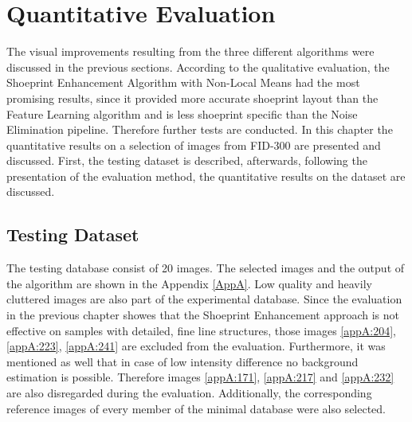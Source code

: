 \documentclass[draft,final]{vutinfth} %
\begin{document}
\section{Quantitative Evaluation}
\par
The visual improvements resulting from the three different algorithms were discussed in the previous sections.
According to the qualitative evaluation, the Shoeprint Enhancement Algorithm with Non-Local Means had the most promising results, since it provided more accurate shoeprint layout than the Feature Learning algorithm and is less shoeprint specific than the Noise Elimination pipeline.
Therefore further tests are conducted.
In this chapter the quantitative results on a selection of images from FID-300 are presented and discussed.
First, the testing dataset is described, afterwards, following the presentation of the evaluation method, the quantitative results on the dataset are discussed.

\subsection{Testing Dataset}

The testing database consist of 20 images.
The selected images and the output of the algorithm are shown in the Appendix \ref{AppA}.
Low quality and heavily cluttered images are also part of the experimental database.
Since the evaluation in the previous chapter showes that the Shoeprint Enhancement approach is not effective on samples with detailed, fine line structures, those images \ref{appA:204}, \ref{appA:223}, \ref{appA:241} are excluded from the evaluation.
Furthermore, it was mentioned as well that in case of low intensity difference no background estimation is possible. 
Therefore images \ref{appA:171}, \ref{appA:217} and \ref{appA:232} are also disregarded during the evaluation.
Additionally, the corresponding reference images of every member of the minimal database were also selected.
\end{document}
